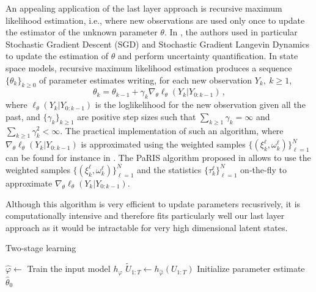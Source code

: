 \documentclass[conference]{IEEEtran}
\begin{document}
An appealing application of the last layer approach is recursive maximum likelihood estimation, i.e., where new observations are used only once to update the estimator of the unknown parameter $\theta$. In \cite{Brosse2020OnLA}, the authors used in particular Stochastic Gradient Descent (SGD) and Stochastic Gradient Langevin Dynamics to update the estimation of $\theta$ and perform uncertainty quantification. In state space models, recursive maximum likelihood estimation produces a sequence $\lbrace\theta_k\rbrace_{k\geq 0}$ of parameter estimates writing, for each new observation $Y_{k},~k\geq 1$,
$$
	\theta_{k} = \theta_{k-1} + \gamma_k \nabla_\theta \ell_{\theta}(Y_k | Y_{0:k - 1}) \,,
$$
where $\ell_{\theta}(Y_k | Y_{0:k - 1})$ is the loglikelihood for the new observation given all the past, and $\lbrace\gamma_k\rbrace_{k\geq 1}$ are positive step sizes such that $\sum_{k \geq 1}\gamma_k = \infty$ and $\sum_{k \geq 1}\gamma_k^2 < \infty$. The practical implementation of such an algorithm, where $\nabla_\theta\ell_{\theta}(Y_k | Y_{0:k - 1})$ is approximated using the weighted samples $\{(\xi^{\ell}_k,\omega^{\ell}_k)\}_{\ell=1}^N$ can be found for instance in \cite{gloaguen2022pseudo}. The PaRIS algorithm proposed in \cite{Olsson2014EfficientPO} allows to use the weighted samples $\{(\xi^{\ell}_k,\omega^{\ell}_k)\}_{\ell=1}^N$ and the statistics $\{\tau^{\ell}_k\}_{\ell=1}^N$ on-the-fly to approximate $\nabla_\theta \ell_{\theta}(Y_k | Y_{0:k - 1})$.

Although this algorithm is very efficient to update parameters recusrively, it is computationally intensive and therefore fits particularly well our last layer approach as it would be intractable for very high dimensional latent states.

\begin{algorithm}
	\caption{Two-stage learning}
	\label{alg:particle_filter}
	$\hat \varphi \gets$ Train the input model $h_\varphi$\;
	$\widetilde U_{1:T} \gets h_{\hat \varphi}(U_{1:T})$\;
	Initialize parameter estimate $\widehat \theta_0$\;

\end{algorithm}
\end{document}
